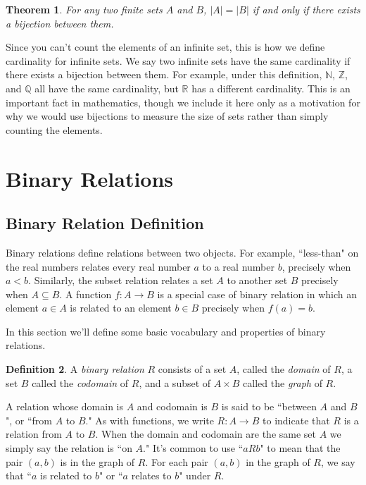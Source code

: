 \documentclass[11pt,oneside]{book}
\newtheorem{thm}{Theorem}[section]
\theoremstyle{definition}
\newtheorem{defn}[thm]{Definition}
\begin{document}
\begin{thm}
    For any two finite sets $A$ and $B$, $|A| = |B|$ if and only if there exists a bijection between them.
\end{thm}

Since you can't count the elements of an infinite set, this is how we define cardinality for infinite sets.
We say two infinite sets have the same cardinality if there exists a bijection between them.
For example, under this definition, $\mathbb{N}$, $\mathbb{Z}$, and $\mathbb{Q}$ all have the same cardinality, but $\mathbb{R}$ has a different cardinality.
This is an important fact in mathematics, though we include it here only as a motivation for why we would use bijections to measure the size of sets rather than simply counting the elements.


\section{Binary Relations}
\subsection{Binary Relation Definition}
Binary relations define relations between two objects.
For example, ``less-than" on the real numbers relates every real number $a$ to a real number $b$, precisely when $a < b$.
Similarly, the subset relation relates a set $A$ to another set $B$ precisely when $A \subseteq B$.
A function $f: A \to B$ is a special case of binary relation in which an element $a \in A$ is related to an element $b \in B$ precisely when $f(a) = b$.

In this section we'll define some basic vocabulary and properties of binary relations.

\begin{defn}
    A \emph{binary relation} $R$ consists of a set $A$, called the \emph{domain} of $R$, a set $B$ called the \emph{codomain} of $R$, and a subset of $A \times B$ called the \emph{graph} of $R$.
\end{defn}

A relation whose domain is $A$ and codomain is $B$ is said to be ``between $A$ and $B$", or ``from $A$ to $B$."
As with functions, we write $R: A \to B$ to indicate that $R$ is a relation from $A$ to $B$.
When the domain and codomain are the same set $A$ we simply say the relation is ``on $A$."
It's common to use ``$a R b$" to mean that the pair $(a, b)$ is in the graph of $R$.
For each pair $(a, b)$ in the graph of $R$, we say that ``$a$ is related to $b$" or ``$a$ relates to $b$" under $R$.
\end{document}
